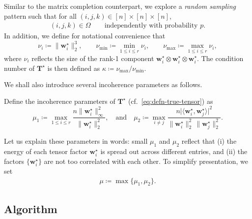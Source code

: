 Similar to the matrix completion counterpart, we explore a {\em random sampling} pattern such that for all $(i,j,k)\in [n]\times [n] \times [n]$,
%
\begin{align}
	(i,j,k) \in \Omega \qquad \text{independently with probability }p.
\end{align}
%
In addition, we define for notational convenience that
%
\begin{equation}
	\nu_{i}\coloneqq\|\bm{w}_{i}^{\star}\|_{2}^{3},\qquad \nu_{\min}\coloneqq \min_{1\leq i\leq r}\nu_{i},\qquad \nu_{\max} \coloneqq \max_{1\leq i\leq r}\nu_{i},
	\label{eq:defn-wi-wmin-wmax-TC}
\end{equation}
%
where $\nu_{i}$ reflects the size of the rank-1 component $\bm{w}_{i}^{\star}\otimes \bm{w}_{i}^{\star}\otimes \bm{w}_{i}^{\star}$. The condition number of $\bm{T}^{\star}$ is then defined as $\kappa \coloneqq \nu_{\max} / \nu_{\min}$.

We shall also introduce several incoherence parameters as follows.
%
\begin{definition}
	Define the incoherence parameters of $\bm{T}^{\star}$ (cf.~\eqref{eq:defn-true-tensor}) as
	\begin{equation}
		\mu_{1}\coloneqq\max_{1\leq i\leq r}\frac{n\|\bm{w}_{i}^{\star}\|_{\infty}^{2}}{\|\bm{w}_{i}^{\star}\|_{2}^{2}},
		\quad \text{and} \quad
		\mu_{2}\coloneqq\max_{i\neq j}\frac{n\big|\langle\bm{w}_{i}^{\star},\bm{w}_{j}^{\star}\rangle\big|^{2}}{\|\bm{w}_{i}^{\star}\|_{2}^{2} \, \|\bm{w}_{j}^{\star}\|_{2}^{2}} .
		\label{eq:defn-incoherence-TC}
	\end{equation}
\end{definition}
%
Let us explain these parameters in words: small $\mu_1$ and $\mu_2$ reflect that (i) the energy of each tensor factor $\bm{w}_i^{\star}$ is spread out across different entries, and (ii) the factors $\{\bm{w}_i^{\star}\}$  are not too correlated with each other. To simplify presentation, we set
%
\begin{align*}
	\mu \coloneqq \max \{ \mu_1, \mu_2 \}.
\end{align*}


\subsection{Algorithm}
\label{sec:algorithm-TC}


